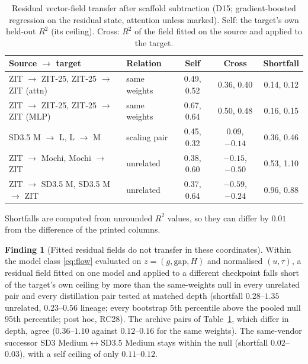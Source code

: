 \documentclass[11pt]{article}
\theoremstyle{definition}
\newtheorem{finding}[theorem]{Finding}
\newcommand{\gap}{\mathrm{gap}}
\newcommand{\TT}{ZIT-25}%
\begin{document}
\begin{table}[htbp]
\centering\small
\caption{Residual vector-field transfer after scaffold subtraction (D15; gradient-boosted regression on the residual state, attention unless marked). Self: the target's own held-out $R^2$ (its ceiling). Cross: $R^2$ of the field fitted on the source and applied to the target.}
\label{tab:transfer}
\begin{tabular}{llccc}
\toprule
Source $\to$ target & Relation & Self & Cross & Shortfall\\
\midrule
ZIT $\to$ \TT{}, \TT{} $\to$ ZIT (attn) & same weights & 0.49, 0.52 & 0.36, 0.40 & 0.14, 0.12\\
ZIT $\to$ \TT{}, \TT{} $\to$ ZIT (MLP) & same weights & 0.67, 0.64 & 0.50, 0.48 & 0.16, 0.15\\
SD3.5 M $\to$ L, L $\to$ M & scaling pair & 0.45, 0.32 & 0.09, $-0.14$ & 0.36, 0.46\\
ZIT $\to$ Mochi, Mochi $\to$ ZIT & unrelated & 0.38, 0.60 & $-0.15$, $-0.50$ & 0.53, 1.10\\
ZIT $\to$ SD3.5 M, SD3.5 M $\to$ ZIT & unrelated & 0.37, 0.64 & $-0.59$, $-0.24$ & 0.96, 0.88\\
\bottomrule
\end{tabular}
\par\smallskip\footnotesize Shortfalls are computed from unrounded $R^2$ values, so they can differ by $0.01$ from the difference of the printed columns.
\end{table}

\begin{finding}[Fitted residual fields do not transfer in these coordinates]\label{fd:nofield}
Within the model class \eqref{eq:flow} evaluated on $z=(g,\gap,H)$ and normalised $(u,\tau)$, a residual field fitted on one model and applied to a different checkpoint falls short of the target's own ceiling by more than the same-weights null in every unrelated pair and every distillation pair tested at matched depth (shortfall $0.28$--$1.35$ unrelated, $0.23$--$0.56$ lineage; every bootstrap 5th percentile above the pooled null 95th percentile; post hoc, RC28). The archive pairs of Table~\ref{tab:transfer}, which differ in depth, agree ($0.36$--$1.10$ against $0.12$--$0.16$ for the same weights). The same-vendor successor SD3 Medium$\leftrightarrow$SD3.5 Medium stays within the null (shortfall $0.02$--$0.03$), with a self ceiling of only $0.11$--$0.12$.
\end{finding}
\end{document}
